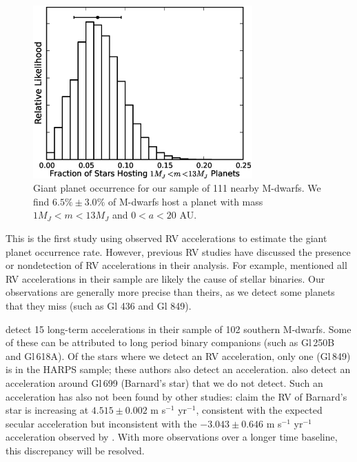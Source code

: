 \begin{figure}[htbp]
\centerline{\includegraphics[width=0.75\textwidth]{chapter3/f9.eps}}
\caption[Posterior distribution of the occurrence rate of giant planets
orbiting M dwarfs]{Giant planet occurrence for our sample of 111 nearby M-dwarfs. We find $6.5\% \pm 3.0\%$ of M-dwarfs host a planet with mass $1 M_J < m < 13 M_J$ and $0 < a < 20$ AU.}
\label{HistoResult}
\end{figure}

This is the first study using observed RV accelerations to estimate the giant planet occurrence rate. However, previous RV studies have discussed the presence or nondetection of RV accelerations in their analysis. For example, \citet{Endl03} mentioned all RV accelerations in their sample are likely the cause of stellar binaries. Our observations are generally more precise than theirs, as we detect some planets that they miss (such as Gl 436 and Gl 849).

\citet{Bonfils13} detect 15 long-term accelerations in their sample of 102 southern M-dwarfs. Some of these can be attributed to long period binary companions (such as Gl\,250B and Gl\,618A). Of the stars where we detect an RV acceleration, only one (Gl\,849) is in the HARPS sample; these authors also detect an acceleration. \citet{Bonfils13} also detect an acceleration around Gl\,699 (Barnard's star) that we do not detect. Such an acceleration has also not been found by other studies: \citet{Choi13} claim the RV of Barnard's star is increasing at $4.515 \pm 0.002$ m s$^{-1}$ yr$^{-1}$, consistent with the expected secular acceleration but inconsistent with the $-3.043 \pm 0.646$ m s$^{-1}$ yr$^{-1}$ acceleration observed by \citet{Bonfils13}. With more observations over a longer time baseline, this discrepancy will be resolved.



